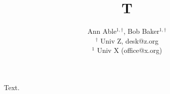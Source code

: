 \documentclass{article}
\begin{document}
\title{T}
\author{Ann Able$^{1,\dagger}$, Bob Baker$^{1,\dagger}$ \\
$^\dagger$ Univ Z, desk@z.org \\
$^1$ Univ X (office@x.org)}
\maketitle
Text.
\end{document}

